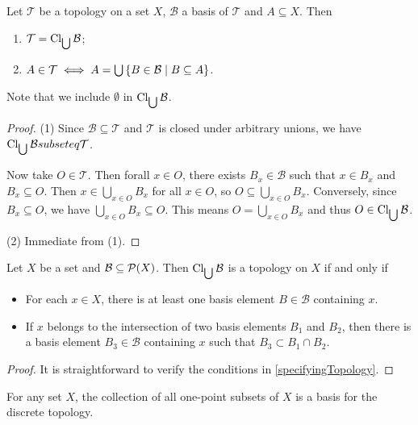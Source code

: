 \begin{lemma}
Let $\mathcal{T}$ be a topology on a set $X$, $\mathcal{B}$ a basis of $\mathcal{T}$ and $A\subseteq X$. Then
\begin{enumerate}
\item $\mathcal{T} = \operatorname{Cl}_{\bigcup}\mathcal{B}$;
\item $A\in \mathcal{T} \iff A = \bigcup\setbuilder{B\in \mathcal{B}}{B\subseteq A}$.
\end{enumerate}
\end{lemma}
Note that we include $\emptyset$ in $\operatorname{Cl}_{\bigcup}\mathcal{B}$.
\begin{proof}
(1) Since $\mathcal{B} \subseteq \mathcal{T}$ and $\mathcal{T}$ is closed under arbitrary unions, we have $\operatorname{Cl}_{\bigcup}\mathcal{B} subseteq \mathcal{T}$. 

Now take $O\in\mathcal{T}$. Then forall $x\in O$, there exists $B_x\in\mathcal{B}$ such that $x\in B_x$ and $B_x \subseteq O$. Then $x\in \bigcup_{x\in O}B_x$ for all $x\in O$, so $O \subseteq \bigcup_{x\in O}B_x$. Conversely, since $B_x\subseteq O$, we have $\bigcup_{x\in O}B_x \subseteq O$. This means $O = \bigcup_{x\in O}B_x$ and thus $O\in \operatorname{Cl}_{\bigcup}\mathcal{B}$.

(2) Immediate from (1).
\end{proof}

\begin{lemma}
Let $X$ be a set and $\mathcal{B}\subseteq \operatorname{\mathcal{P}}(X)$. Then $\operatorname{Cl}_{\bigcup}\mathcal{B}$ is a topology on $X$ \textup{if and only if}
\begin{itemize}
\item For each $x\in X$, there is at least one basis element $B\in\mathcal{B}$ containing $x$.
\item If $x$ belongs to the intersection of two basis elements $B_1$ and $B_2$, then there is a basis element $B_3\in\mathcal{B}$ containing $x$ such that $B_3\subset B_1 \cap B_2$.
\end{itemize}
\end{lemma}
\begin{proof}
It is straightforward to verify the conditions in \ref{specifyingTopology}. 
\end{proof}

\begin{example}
For any set $X$, the collection of all one-point subsets of $X$ is a basis for the discrete topology.
\end{example}

